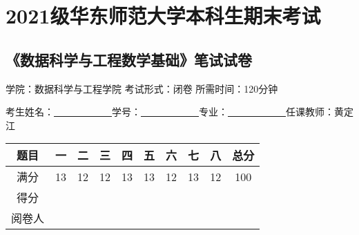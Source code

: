 \documentclass[12pt,a4paper,openany,twoside]{ctexbook}
\begin{document}
\setcounter{chapter}{1}
\chapter*{2021级华东师范大学本科生期末考试}
\section*{《数据科学与工程数学基础》笔试试卷 }
\begin{center}
	学院：数据科学与工程学院 \qquad 考试形式：闭卷 \qquad 所需时间：120分钟
\end{center}
\begin{center}
	考生姓名：\underline{~~~~~~}\underline{~~~~~~}\qquad 学号：\underline{~~~~~~}\underline{~~~~~~}\qquad 专业：\underline{~~~~~~}\underline{~~~~~~}\qquad 任课教师：黄定江
\end{center}
{ \begin{center}
		\begin{tabular}{|c|c|c|c|c|c|c|c|c|c|}
			\hline 
			题目 & 一 & 二 & 三 & 四 & 五 & 六 & 七 & 八&总分 \\ 
			\hline 
			满分 & 13 & 12 & 12 & 13 & 13 & 12 & 13 & 12 & 100  \\ 
			\hline 
			得分 &  &  &  &  &  &  &  & &  \\ 
			\hline 
			阅卷人 &  &  &  &  &  &  &  & &  \\ 
			\hline 
		\end{tabular} 
		
\end{center}}
\end{document}
